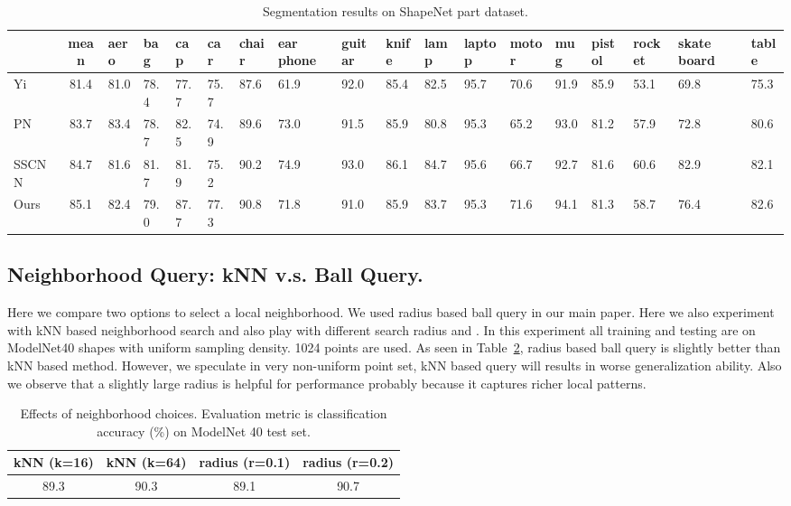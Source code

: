 \documentclass{article}
\begin{document}
\begin{table}[th!]
    \scriptsize
    \centering
    \begin{tabular}[width=\linewidth]{l|c|p{0.3cm}p{0.25cm}p{0.25cm}p{0.25cm}p{0.25cm}p{0.3cm}p{0.3cm}p{0.3cm}p{0.3cm}p{0.4cm}p{0.4cm}p{0.25cm}p{0.3cm}p{0.3cm}p{0.35cm}p{0.3cm}}
    \toprule
    ~        & mean & aero & bag & cap & car & chair & ear phone & guitar & knife & lamp & laptop & motor & mug & pistol & rocket & skate board& table \\ 
    \midrule
Yi~\cite{Yi16} & 81.4 & 81.0 & 78.4 & 77.7 & 75.7 & 87.6 & 61.9 & 92.0 & 85.4 & 82.5 & 95.7 & 70.6 & 91.9 & 85.9 & 53.1 & 69.8 & 75.3 \\
PN~\cite{qi2016pointnet} & 83.7 & 83.4 & 78.7 & 82.5 & 74.9 & 89.6 & 73.0 & 91.5 & 85.9 & 80.8 & 95.3 & 65.2 & 93.0 & 81.2 & 57.9 & 72.8 & 80.6 \\
    SSCNN~\cite{yi2016syncspeccnn} & 84.7 & 81.6 & 81.7 & 81.9 & 75.2 & 90.2 & 74.9 & 93.0 & 86.1 & 84.7 & 95.6 & 66.7 & 92.7 & 81.6 & 60.6 & 82.9 & 82.1 \\
    \midrule
    Ours & 85.1 & 82.4 & 79.0 & 87.7 & 77.3 & 90.8 & 71.8 & 91.0 & 85.9 & 83.7 & 95.3 & 71.6 & 94.1 & 81.3 & 58.7 & 76.4 & 82.6 \\
    \bottomrule
    \end{tabular}
    \caption{Segmentation results on ShapeNet part dataset.}
    \label{tab:partseg}
\end{table}

\subsection{Neighborhood Query: kNN v.s. Ball Query.}
Here we compare two options to select a local neighborhood. We used radius based ball query in our main paper. Here we also experiment with kNN based neighborhood search and also play with different search radius and . In this experiment all training and testing are on ModelNet40 shapes with uniform sampling density. 1024 points are used. As seen in Table~\ref{tab:neighborhood}, radius based ball query is slightly better than kNN based method. However, we speculate in very non-uniform point set, kNN based query will results in worse generalization ability. Also we observe that a slightly large radius is helpful for performance probably because it captures richer local patterns.

\begin{table}[h!]
\centering
\begin{tabular}{cccc}
\toprule
kNN (k=16) & kNN (k=64) & radius (r=0.1) & radius (r=0.2) \\ \midrule
89.3 & 90.3 & 89.1 & 90.7 \\ \bottomrule
\end{tabular}
\caption{Effects of neighborhood choices. Evaluation metric is classification accuracy (\%) on ModelNet 40 test set.}
\label{tab:neighborhood}
\end{table}
\end{document}
